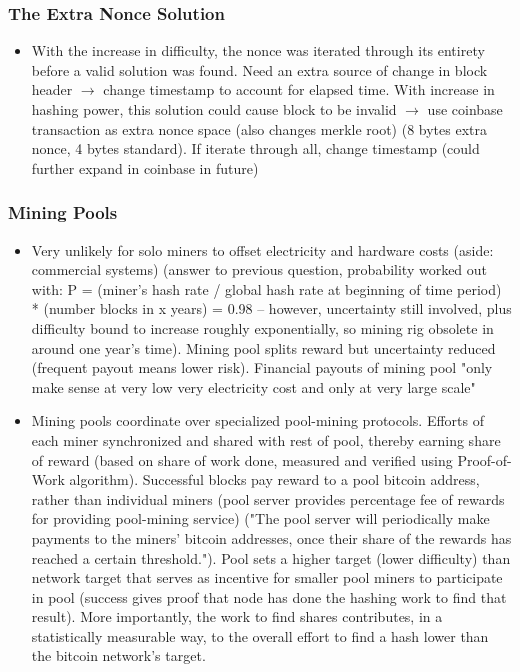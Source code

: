 \documentclass[english, 11pt]{article}
\begin{document}
\subsubsection{The Extra Nonce Solution}
\begin{itemize}
    \item With the increase in difficulty, the nonce was iterated through its entirety before a valid solution was found. Need an extra source of change in block header $\rightarrow$ change timestamp to account for elapsed time. With increase in hashing power, this solution could cause block to be invalid $\rightarrow$ use coinbase transaction as extra nonce space (also changes merkle root) (8 bytes extra nonce, 4 bytes standard). If iterate through all, change timestamp (could further expand in coinbase in future)
\end{itemize}

\subsubsection{Mining Pools}
\begin{itemize}
    \item Very unlikely for solo miners to offset electricity and hardware costs (aside: commercial systems) (answer to previous question, probability worked out with: P = (miner's hash rate / global hash rate at beginning of time period) * (number blocks in x years) = 0.98 -- however, uncertainty still involved, plus difficulty bound to increase roughly exponentially, so mining rig obsolete in around one year's time). Mining pool splits reward but uncertainty reduced (frequent payout means lower risk). Financial payouts of mining pool "only make sense at very low very electricity cost and only at very large scale"
    \item Mining pools coordinate over specialized pool-mining protocols. Efforts of each miner synchronized and shared with rest of pool, thereby earning share of reward (based on share of work done, measured and verified using Proof-of-Work algorithm). Successful blocks pay reward to a pool bitcoin address, rather than individual miners (pool server provides percentage fee of rewards for providing pool-mining service) ("The pool server will periodically make payments to the miners' bitcoin addresses, once their share of the rewards has reached a certain threshold."). Pool sets a higher target (lower difficulty) than network target that serves as incentive for smaller pool miners to participate in pool (success gives proof that node has done the hashing work to find that result). More importantly, the work to find shares contributes, in a statistically measurable way, to the overall effort to find a hash lower than the bitcoin network’s target. 
\end{itemize}
\end{document}
